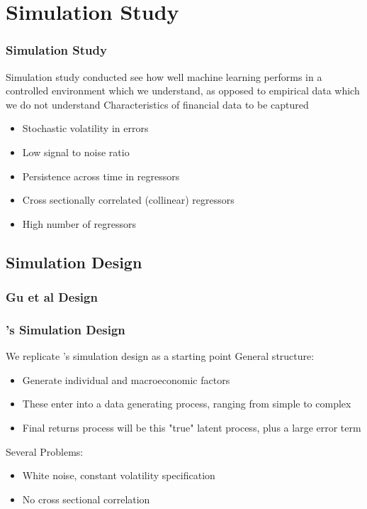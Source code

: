 \documentclass[aspectratio=169]{beamer}
\begin{document}
\section{Simulation Study}

\begin{frame}
\frametitle{Simulation Study}
Simulation study conducted see how well machine learning performs in a controlled environment which we understand, as opposed to empirical data which we do not understand
Characteristics of financial data to be captured
\begin{itemize}
	\item Stochastic volatility in errors
	\item Low signal to noise ratio
	\item Persistence across time in regressors
	\item Cross sectionally correlated (collinear) regressors
	\item High number of regressors
\end{itemize}
\end{frame}

\subsection{Simulation Design}


\subsubsection{Gu et al Design}

\begin{frame}
\frametitle{\cite{gu_empirical_2018}'s Simulation Design}
We replicate \cite{gu_empirical_2018}'s simulation design as a starting point
General structure:
\begin{itemize}
\item Generate individual and macroeconomic factors
\item These enter into a data generating process, ranging from simple to complex
\item Final returns process will be this "true" latent process, plus a large error term
\end{itemize}
Several Problems:
\begin{itemize}
	\item White noise, constant volatility specification
	\item No cross sectional correlation
\end{itemize}
\end{frame}
\end{document}
